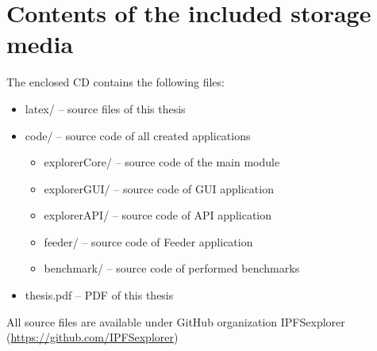 
\chapter{Contents of the included storage media}

The enclosed CD contains the following files:
\begin{itemize}
    \item latex/ -- source files of this thesis
    \item code/ -- source code of all created applications
        \begin{itemize}
            \item explorerCore/ -- source code of the main module
            \item explorerGUI/ -- source code of GUI application
            \item explorerAPI/ -- source code of API application
            \item feeder/ -- source code of Feeder application
            \item benchmark/ -- source code of performed benchmarks
        \end{itemize}
    \item thesis.pdf -- PDF of this thesis
\end{itemize}

All source files are available under GitHub organization IPFSexplorer (\url{https://github.com/IPFSexplorer})
